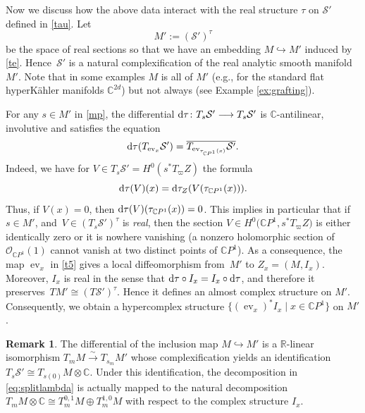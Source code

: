 \documentclass[pdftex]{sigma}
\numberwithin{equation}{section}
\theoremstyle{definition}
\newtheorem{Remark}[Theorem]{Remark}
\newcommand\C{{\mathbb C}}
\begin{document}
Now we discuss how the above data interact with the real structure $\tau$ on $\mathcal S'$ defined in \eqref{tau}.
Let
\begin{equation}\label{mp}
M' := (\mathcal{S}')^\tau
\end{equation}
be the space of real sections so that we have an embedding $M \hookrightarrow M'$ induced by \eqref{te}.
Hence~$\mathcal{S}'$ is a natural complexification of the real analytic smooth manifold $M'$. Note that
in some examples $M$ is all of $M'$ \big(e.g., for the standard flat hyperK\"ahler
manifolds $\C^{2d}$\big) but not always (see Example \ref{ex:grafting}).

For any $s \in M'$ in \eqref{mp}, the differential ${\rm d}\tau \colon T_s{\mathcal S}'
 \longrightarrow T_s{\mathcal S}'$ is $\mathbb C$-antilinear, involutive
and satisfies the equation
\[%
{\rm d}\tau(T_{\operatorname{ev}_{x}}\mathcal S') = \overline{T_{\operatorname{ev}_{\tau_{\C P^1}(x)}}\mathcal S'}.
\]
Indeed, we have for $V \in T_s\mathcal S' = H^0(s^*T_\varpi Z)$ the formula
\[
{\rm d}\tau(V)(x) = {\rm d}\tau_Z(V(\tau_{\C P^1}(x))).
\]
Thus, if $V(x) = 0$, then ${\rm d}\tau(V)(\tau_{\C P^1}(x)) = 0$. This implies in
particular that if $s \in M'$, and~${V \in (T_s\mathcal S')^\tau}$ is \emph{real}, then the
section $V \in H^0\bigl(\C P^1, s^*T_\varpi Z\bigr)$ is either identically zero or it is nowhere
vanishing (a nonzero holomorphic section of ${\mathcal O}_{\C P^1}(1)$ cannot vanish at two
distinct points of $\C P^1$). As a consequence, the map $\operatorname{ev}_x$ in \eqref{t5} gives a
local diffeomorphism from~$M'$ to $Z_x = (M, I_x)$. Moreover, $I_x$ is real in the sense that
${\rm d}\tau \circ I_x = I_x\circ {\rm d}\tau$, and therefore it preserves~${TM' \cong (T\mathcal S')^\tau}$.
Hence it defines an almost complex structure on $M'$. Consequently, we obtain a hypercomplex
structure $\bigl\{(\operatorname{ev}_x)^* I_x \mid x \in \C P^1\bigr\}$ on $M'$.

\begin{Remark}\label{rem:T10M}
The differential of the inclusion map $M \hookrightarrow M'$ is a $\mathbb R$-linear isomorphism
$T_{m}M \stackrel{\sim}{\longrightarrow} T_{s_m}M'$ whose complexification yields an identification
$T_s\mathcal S' \cong T_{s(0)}M\otimes \C$. Under this identification, the
decomposition in \eqref{eq:splitlambda} is actually mapped to the natural decomposition~${T_{m}M\otimes\C \cong T_m^{0,1}M\oplus T_m^{1,0}M}$ with respect to the complex structure $I_x$.
\end{Remark}
\end{document}
